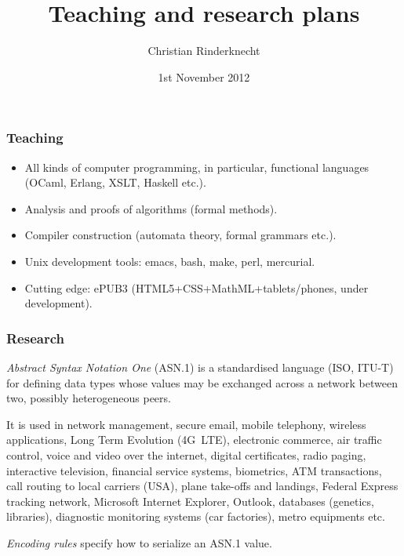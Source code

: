 \documentclass[compress,dvips,xcolor={dvipsnames},t]{beamer}
\title{Teaching and research plans}
\author{Christian Rinderknecht}
\date{1st November 2012}
\newcommand\ASN{\textsf{ASN.1}\xspace}
\begin{document}
\frame{\maketitle}

\begin{frame}
\frametitle{Teaching}

\begin{itemize}

  \item All kinds of computer programming, in particular, functional
  languages (OCaml, Erlang, XSLT, Haskell etc.).

  \item Analysis and proofs of algorithms (formal methods).

  \item Compiler construction (automata theory, formal grammars etc.).

  \item Unix development tools: emacs, bash, make, perl, mercurial.

  \item Cutting edge: ePUB3 (HTML5+CSS+MathML+tablets/phones, under
    development).

\end{itemize}

\end{frame}


\begin{frame}
\frametitle{Research}

\emph{Abstract Syntax Notation One} (\ASN) is a standardised language
(ISO, ITU-T) for defining data types whose values may be exchanged
across a network between two, possibly heterogeneous peers.

\bigskip

It is used in network management, secure email, mobile telephony, wireless applications, Long Term Evolution (4G~LTE), electronic commerce, air traffic control, voice and video over the internet, digital certificates, radio paging, interactive television, financial service systems, biometrics, ATM transactions, call routing to local carriers (USA), plane take-offs and landings, Federal Express tracking network, Microsoft Internet Explorer, Outlook, databases (genetics, libraries), diagnostic monitoring systems (car factories), metro equipments etc.

\bigskip

\emph{Encoding rules} specify how to serialize an \ASN value.

\end{frame}
\end{document}
